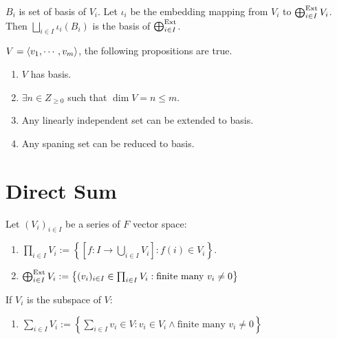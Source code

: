 \begin{proposition}
    $B_i$ is set of basis of $V_i$. Let $\iota_i$ be the embedding mapping from $V_i$ to $\bigoplus^{\mathrm{Ext}}_{i\in I} V_i$. Then $\bigsqcup_{i\in I} \iota_i (B_i)$ is the basis of $\bigoplus^{\mathrm{Ext}}_{i\in I}$.
\end{proposition}





\begin{proposition}
    $V = \langle v_1, \cdots, v_m \rangle$, the following propositions are true.
    \begin{enumerate}
        \item $V$ has basis.
        \item $\exists n \in Z_{\geq 0}$ such that $\dim V = n \leq m$.
        \item Any linearly independent set can be extended to basis.
        \item Any spaning set can be reduced to basis.
    \end{enumerate}
\end{proposition}








\section{Direct Sum}

\begin{definition}
    Let $(V_i)_{i \in I}$ be a series of $F$ \mbl vector space:
    \begin{enumerate}
        \item $\prod_{i \in I} V_i := \left\{ \left[f: I \to \bigcup_{i \in I} V_i\right]: f(i) \in V_i \right\}$.
        \item $\bigoplus^{\mathrm{Ext}}_{i \in I} V_i := \left\{ (v_i)_{i\in I} \in \prod_{i \in I} V_i : \text{finite many } v_i \neq 0 \right\}$
    \end{enumerate}
    If $V_i$ is the subspace of $V$:
    \begin{enumerate}
        \item $\sum_{i \in I} V_i := \left\{ \sum_{i \in I} v_i \in V: v_i \in V_i \land \text{finite many } v_i \neq 0 \right\}$
    \end{enumerate}
\end{definition}


